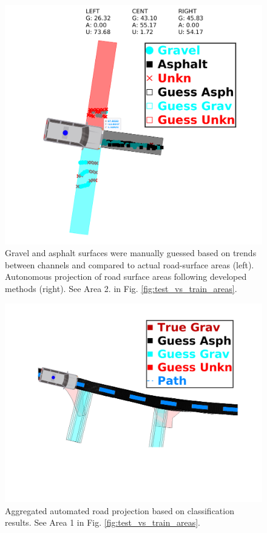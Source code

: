 \documentclass[journal,onecolumn]{IEEEtran}
\begin{document}
			\begin{figure}[H]
				\centering
				\includegraphics[width=0.75\linewidth]{figures/auto_area_guess_4}
				\caption[Projected Guess vs Truth]{Gravel and asphalt surfaces were manually guessed based on trends between channels and compared to actual road-surface areas (left). Autonomous projection of road surface areas following developed methods (right). See Area 2. in Fig. \ref{fig:test_vs_train_areas}.}
				\label{fig:auto_area_guess}
			\end{figure}

			\begin{figure}[H]
				\centering
				\includegraphics[width=0.75\linewidth]{figures/auto_guess_v_truth_2}
				\caption[Projected Guess over Time vs Truth]{Aggregated automated road projection based on classification results. See Area 1 in Fig. \ref{fig:test_vs_train_areas}.}
				\label{fig:auto_guess_v_truth}
			\end{figure}
\end{document}
